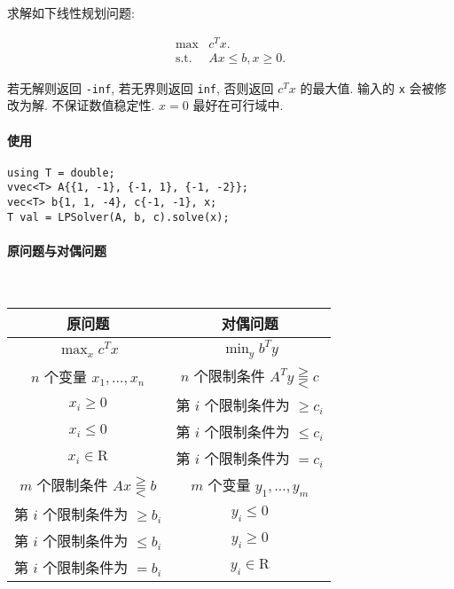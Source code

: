 求解如下线性规划问题:

\[
    \begin{array}{ll}
        \max          & c^T x.             \\
        \textrm{s.t.} & Ax \le b, x \ge 0.
    \end{array}
\]

若无解则返回 \verb|-inf|, 若无界则返回 \verb|inf|, 否则返回 \(c^T x\) 的最大值. 输入的 \verb|x| 会被修改为解. 不保证数值稳定性. \(x = 0\) 最好在可行域中.

\paragraph{使用}

\begin{verbatim}
using T = double;
vvec<T> A{{1, -1}, {-1, 1}, {-1, -2}};
vec<T> b{1, 1, -4}, c{-1, -1}, x;
T val = LPSolver(A, b, c).solve(x);
\end{verbatim}

\paragraph{原问题与对偶问题}~\\

\begin{tabular}{c|c}
    \hline
    原问题                               & 对偶问题                                \\
    \hline
    \(\max_x c^T x\)                     & \(\min_y b^T y\)                        \\
    \hline
    \(n\) 个变量 \(x_1,\dots,x_n\)       & \(n\) 个限制条件 \(A^T y\gtreqqless c\) \\
    \(x_i\geq 0\)                        & 第 \(i\) 个限制条件为 \(\geq c_i\)      \\
    \(x_i\leq 0\)                        & 第 \(i\) 个限制条件为 \(\leq c_i\)      \\
    \(x_i\in \mathrm{R}\)                & 第 \(i\) 个限制条件为 \(=c_i\)          \\
    \hline
    \(m\) 个限制条件 \(Ax\gtreqqless b\) & \(m\) 个变量 \(y_1,\dots,y_m\)          \\
    第 \(i\) 个限制条件为 \(\geq b_i\)   & \(y_i\leq 0\)                           \\
    第 \(i\) 个限制条件为 \(\leq b_i\)   & \(y_i\geq 0\)                           \\
    第 \(i\) 个限制条件为 \(=b_i\)       & \(y_i\in \mathrm{R}\)                   \\
    \hline
\end{tabular}

